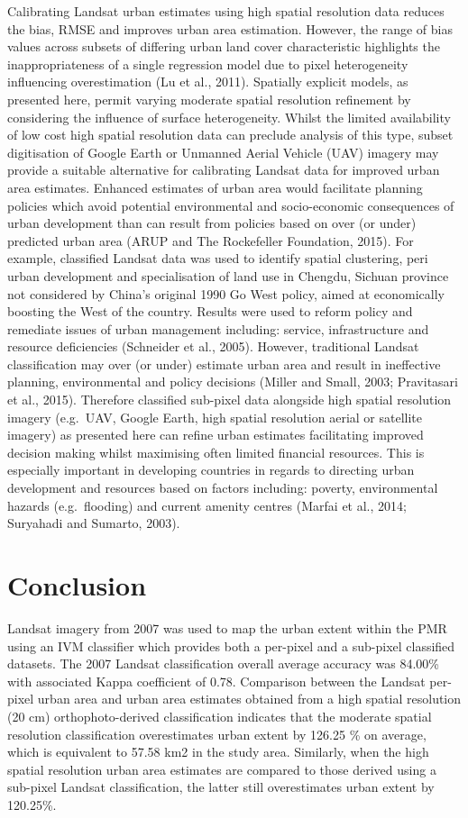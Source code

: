 \documentclass[]{book}
\begin{document}
Calibrating Landsat urban estimates using high spatial resolution data
reduces the bias, RMSE and improves urban area estimation. However, the
range of bias values across subsets of differing urban land cover
characteristic highlights the inappropriateness of a single regression
model due to pixel heterogeneity influencing overestimation (Lu et al.,
2011). Spatially explicit models, as presented here, permit varying
moderate spatial resolution refinement by considering the influence of
surface heterogeneity. Whilst the limited availability of low cost high
spatial resolution data can preclude analysis of this type, subset
digitisation of Google Earth or Unmanned Aerial Vehicle (UAV) imagery
may provide a suitable alternative for calibrating Landsat data for
improved urban area estimates. Enhanced estimates of urban area would
facilitate planning policies which avoid potential environmental and
socio-economic consequences of urban development than can result from
policies based on over (or under) predicted urban area (ARUP and The
Rockefeller Foundation, 2015). For example, classified Landsat data was
used to identify spatial clustering, peri urban development and
specialisation of land use in Chengdu, Sichuan province not considered
by China's original 1990 Go West policy, aimed at economically boosting
the West of the country. Results were used to reform policy and
remediate issues of urban management including: service, infrastructure
and resource deficiencies (Schneider et al., 2005). However, traditional
Landsat classification may over (or under) estimate urban area and
result in ineffective planning, environmental and policy decisions
(Miller and Small, 2003; Pravitasari et al., 2015). Therefore classified
sub-pixel data alongside high spatial resolution imagery (e.g.~UAV,
Google Earth, high spatial resolution aerial or satellite imagery) as
presented here can refine urban estimates facilitating improved decision
making whilst maximising often limited financial resources. This is
especially important in developing countries in regards to directing
urban development and resources based on factors including: poverty,
environmental hazards (e.g.~flooding) and current amenity centres
(Marfai et al., 2014; Suryahadi and Sumarto, 2003).

\section{Conclusion}\label{conclusion}

Landsat imagery from 2007 was used to map the urban extent within the
PMR using an IVM classifier which provides both a per-pixel and a
sub-pixel classified datasets. The 2007 Landsat classification overall
average accuracy was 84.00\% with associated Kappa coefficient of 0.78.
Comparison between the Landsat per-pixel urban area and urban area
estimates obtained from a high spatial resolution (20 cm)
orthophoto-derived classification indicates that the moderate spatial
resolution classification overestimates urban extent by 126.25 \% on
average, which is equivalent to 57.58 km2 in the study area. Similarly,
when the high spatial resolution urban area estimates are compared to
those derived using a sub-pixel Landsat classification, the latter still
overestimates urban extent by 120.25\%.
\end{document}

